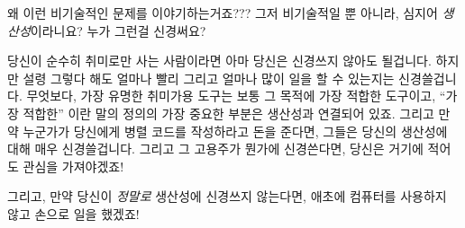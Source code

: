\QuickQ{}
	왜 이런 비기술적인 문제를 이야기하는거죠???
	그저 비기술적일 뿐 아니라, 심지어 \emph{생산성}이라니요?
	누가 그런걸 신경써요?

\QuickA{}
	당신이 순수히 취미로만 사는 사람이라면 아마 당신은 신경쓰지 않아도
	될겁니다.
	하지만 설령 그렇다 해도 얼마나 빨리 그리고 얼마나 많이 일을 할 수
	있는지는 신경쓸겁니다.
	무엇보다, 가장 유명한 취미가용 도구는 보통 그 목적에 가장 적합한
	도구이고, ``가장 적합한'' 이란 말의 정의의 가장 중요한 부분은 생산성과
	연결되어 있죠.
	그리고 만약 누군가가 당신에게 병렬 코드를 작성하라고 돈을 준다면,
	그들은 당신의 생산성에 대해 매우 신경쓸겁니다.
	그리고 그 고용주가 뭔가에 신경쓴다면, 당신은 거기에 적어도 관심을
	가져야겠죠!

	그리고, 만약 당신이 \emph{정말로} 생산성에 신경쓰지 않는다면, 애초에
	컴퓨터를 사용하지 않고 손으로 일을 했겠죠!

